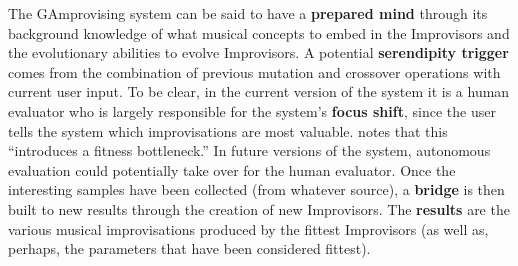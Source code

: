 The {\sf GAmprovising} system can be said to have a \textbf{prepared mind} through its background knowledge of what musical concepts to embed in the Improvisors and the evolutionary abilities to evolve Improvisors. A potential \textbf{serendipity trigger} comes from the combination of previous mutation and crossover operations with current user input.  To be clear, in the current version of the system it is a human evaluator who is largely responsible for the system's \textbf{focus shift}, since the user tells the system which improvisations are most valuable.   
notes that this ``introduces a fitness bottleneck.''  In future versions of the system, autonomous evaluation could potentially take over for the human evaluator.  Once the interesting samples have been collected (from whatever source), a \textbf{bridge} is then built to new results through the creation of new Improvisors.  The \textbf{results} are the various musical improvisations produced by the fittest Improvisors (as well as, perhaps, the parameters that have been considered fittest).

